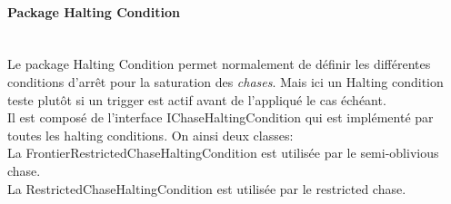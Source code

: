         
        \paragraph{Package Halting Condition}\ \\
        Le package Halting Condition permet normalement de définir les différentes conditions d'arrêt pour la saturation des \textit{chases}. Mais ici un Halting condition teste plutôt si un trigger est actif avant de l'appliqué le cas échéant.\\ 
        Il est composé de l'interface IChaseHaltingCondition qui est implémenté par toutes les halting conditions. On ainsi deux classes:\\
        La FrontierRestrictedChaseHaltingCondition est utilisée par le semi-oblivious chase. \\
        La RestrictedChaseHaltingCondition est utilisée par le restricted chase.

